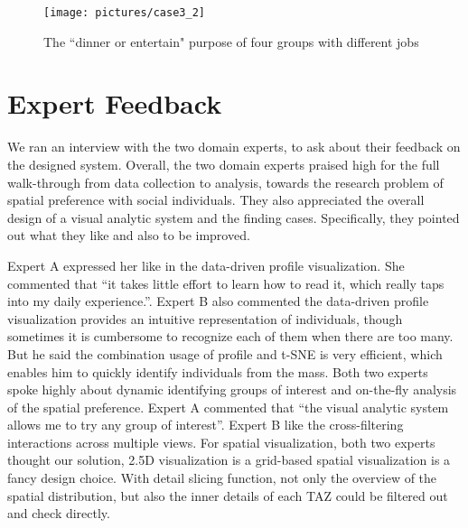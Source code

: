 \documentclass{ieeeaccess}
\begin{document}
\begin{figure}[htb!]
 \centering %
 \texttt{[image: pictures/case3\_2]}
 \caption{The ``dinner or entertain" purpose of four groups with different jobs}
 \label{case32}
\end{figure}




\section{Expert Feedback}


We ran an interview with the two domain experts, to ask about their feedback on the designed system. Overall, the two domain experts praised high for the full walk-through from data collection to analysis, towards the research problem of spatial preference with social individuals. They also appreciated the overall design of a visual analytic system and the finding cases. Specifically, they pointed out what they like and also to be improved.

Expert A expressed her like in the data-driven profile visualization. She commented that ``it takes little effort to learn how to read it, which really taps into my daily experience.''. Expert B also commented the data-driven profile visualization provides an intuitive representation of individuals, though sometimes it is cumbersome to recognize each of them when there are too many. But he said the combination usage of profile and t-SNE is very efficient, which enables him to quickly identify individuals from the mass. Both two experts spoke highly about dynamic identifying groups of interest and on-the-fly analysis of the spatial preference. Expert A commented that ``the visual analytic system allows me to try any group of interest''. Expert B like the cross-filtering interactions across multiple views.  For spatial visualization, both two experts thought our solution, 2.5D visualization is a grid-based spatial visualization is a fancy design choice. With detail slicing function, not only the overview of the spatial distribution, but also the inner details of each TAZ could be filtered out and check directly.
\end{document}
